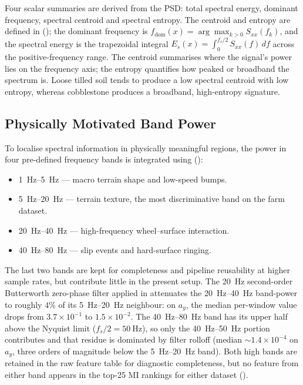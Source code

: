 Four scalar summaries are derived from the PSD: total spectral energy, dominant frequency, spectral centroid and spectral entropy. The centroid and entropy are defined in  (); the dominant frequency is $f_{\mathrm{dom}}(x) = \arg\max_{k>0} S_{xx}(f_k)$, and the spectral energy is the trapezoidal integral $E_s(x) = \int_{0}^{f_s/2} S_{xx}(f)\,df$ across the positive-frequency range. The centroid summarises where the signal's power lies on the frequency axis; the entropy quantifies how peaked or broadband the spectrum is. Loose tilled soil tends to produce a low spectral centroid with low entropy, whereas cobblestone produces a broadband, high-entropy signature.

\subsection{Physically Motivated Band Power}

To localise spectral information in physically meaningful regions, the power in four pre-defined frequency bands is integrated using  ():

\begin{itemize}
    \item \SIrange{1}{5}{\hertz} --- macro terrain shape and low-speed bumps.
    \item \SIrange{5}{20}{\hertz} --- terrain texture, the most discriminative band on the farm dataset.
    \item \SIrange{20}{40}{\hertz} --- high-frequency wheel--surface interaction.
    \item \SIrange{40}{80}{\hertz} --- slip events and hard-surface ringing.
\end{itemize}

The last two bands are kept for completeness and pipeline reusability at higher sample rates, but contribute little in the present setup. The \SI{20}{\hertz} second-order Butterworth zero-phase filter applied in  attenuates the \SIrange{20}{40}{\hertz} band-power to roughly $4\%$ of its \SIrange{5}{20}{\hertz} neighbour: on $a_y$, the median per-window value drops from $3.7 \times 10^{-1}$ to $1.5 \times 10^{-2}$. The \SIrange{40}{80}{\hertz} band has its upper half above the Nyquist limit ($f_s/2 = \SI{50}{\hertz}$), so only the \SIrange{40}{50}{\hertz} portion contributes and that residue is dominated by filter rolloff (median $\sim 1.4 \times 10^{-4}$ on $a_y$, three orders of magnitude below the \SIrange{5}{20}{\hertz} band). Both high bands are retained in the raw feature table for diagnostic completeness, but no feature from either band appears in the top-25 MI rankings for either dataset ().

